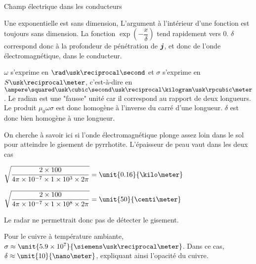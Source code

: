\begin{corr}{Champ électrique dans les conducteurs}
	\begin{corrlist}
		\item Une exponentielle est sans dimension, 
			L'argument à l'intérieur d'une fonction est toujours sans
			dimension. 
			La fonction $\exp\left(-\dfrac{x}{\delta}\right)$
			tend rapidement vers $0$. $\delta$ correspond donc à la
			profondeur de pénétration de $\vecj$, et donc de 
			l'onde électromagnétique, dans le conducteur.
		\item $\omega$ s'exprime en $\rad \usk \reciprocal \second$ et  
		  $\sigma$ s'exprime en $S \usk \reciprocal \meter$, c'est-à-dire 
		  en $\ampere \squared \usk \cubic \second \usk \reciprocal \kilogram
		  \usk \rpcubic \meter$. Le radian est une "fausse" unité car il
		  correspond au rapport de deux longueurs. Le produit $\mu_0
		  \omega \sigma$ est donc homogène à l'inverse du carré d'une longueur.
		  $\delta$ est donc bien homogène à une longueur.
		\item  On cherche à savoir ici si l'onde électromagnétique
		   plonge assez loin dans le sol pour atteindre le gisement de 
		   pyrrhotite. L'épaisseur de peau vaut dans les deux cas
		   \begin{corrlist}
			   \item $\sqrt{\dfrac{2 \times 100}{4 \pi \times 10^{-7} 
			    \times 1 \times 10^3 \times 2\pi}}
			  = \unit{0.16}{\kilo \meter}$
			\item $\sqrt{\dfrac{2 \times 100}{4 \pi \times 10^{-7} 
			    \times 1 \times 10^8 \times 2\pi}}
			  = \unit{50}{\centi \meter}$
		  \end{corrlist}
		  Le radar ne permettrait donc pas de détecter le gisement.

   	\item Pour le cuivre à température ambiante, $\sigma \approx 
          \unit{5.9 \times 10^7}{\siemens \usk \reciprocal \meter}$. 
	  Dans ce cas, $\delta \approx \unit{10}{\nano \meter}$, expliquant ainsi
	  l'opacité du cuivre.
	\end{corrlist}



\end{corr}
